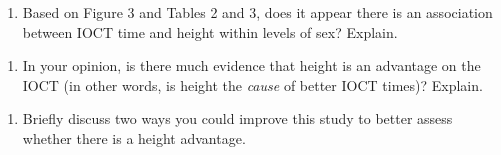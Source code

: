 \documentclass[
]{book}
\providecommand{\tightlist}{%
  \setlength{\itemsep}{0pt}\setlength{\parskip}{0pt}}
\begin{document}
\begin{enumerate}
\def\labelenumi{\arabic{enumi}.}
\setcounter{enumi}{13}
\tightlist
\item
  Based on Figure 3 and Tables 2 and 3, does it appear there is an association between IOCT time and height within levels of sex? Explain.
\end{enumerate}

\vspace{1in}

\newpage

\begin{enumerate}
\def\labelenumi{\arabic{enumi}.}
\setcounter{enumi}{14}
\tightlist
\item
  In your opinion, is there much evidence that height is an advantage on the IOCT (in other words, is height the \emph{cause} of better IOCT times)? Explain.
\end{enumerate}

\vspace{2in}

\begin{enumerate}
\def\labelenumi{\arabic{enumi}.}
\setcounter{enumi}{15}
\tightlist
\item
  Briefly discuss two ways you could improve this study to better assess whether there is a height advantage.
\end{enumerate}

\vspace{1in}

  
\end{document}
